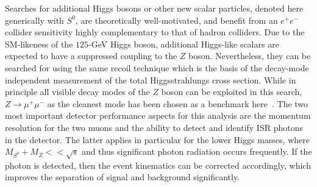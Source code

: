 Searches for additional Higgs bosons or other new scalar particles, denoted here generically with $S^0$, are theoretically well-motivated, and benefit from an $e^+e^-$ collider sensitivity highly
complementary to that of hadron colliders. Due to the SM-likeness of the $125$-GeV Higgs boson, additional Higgs-like scalars are expected to have a suppressed coupling to the $Z$ boson. Nevertheless, they can 
be searched for using the same recoil technique which is the basis of the decay-mode independent measurement
of the total Higgsstrahlungs cross section. While in principle all visible decay modes of the $Z$ boson can
be exploited in this search, $Z\to\mu^+\mu^-$ as the cleanest mode has been chosen as a benchmark here~\cite{ILDNote:extraH}.
The two most important detector performance aspects for this analysis are the momentum resolution for the two
muons and the ability to detect and identify ISR photons in the detector. The latter applies in particular for the lower Higgs masses, where $M_{S^0} + M_Z << \sqrt{s}$ and thus significant photon radiation occurs frequently.
If the photon is detected, then the event kinematics can be corrected accordingly, which improves the separation of signal and background significantly.


